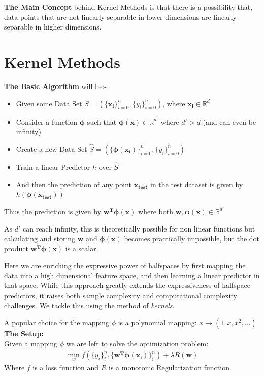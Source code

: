 \documentclass[12pt]{article}
\begin{document}
\noindent
\textbf{The Main Concept} behind Kernel Methods is that there is a possibility that, data-points that are not linearly-separable in lower dimensions are linearly-separable in higher dimensions. 


\section{Kernel Methods}
\noindent\textbf{The Basic Algorithm} will be:-
\vspace{-5pt}
\begin{itemize}
    \setlength\itemsep{2pt}
    \item Given some Data Set $S = (\{\bm{x_i}\}_{i=0}^n, \{y_i\}_{i=0}^n)$, where $\bm{x_i}\in \mathbb{R}^d$
    \item Consider a function $\bm{\phi}$ such that $\bm{\phi(x)} \in \mathbb{R}^{d'}$ where $d' > d$ (and can even be infinity)
    \item Create a new Data Set $\hat{S} = (\{\bm{\phi(x_i)}\}_{i=0}^n, \{y_i\}_{i=0}^n)$
    \item Train a linear Predictor $h$ over $\hat{S}$
    \item And then the prediction of any point $\bm{x_{test}}$ in the test dataset is given by $h(\bm{\phi(x_{test})})$
\end{itemize}
\noindent
Thus the prediction is given by $\bm{w^T\phi(x)}$ where both $\bm{w}, \bm{\phi(x)} \in \mathbb{R}^{d'}$ 

As $d'$ can reach infinity, this is theoretically possible for non linear functions but calculating and storing $\bm{w}$ and $\bm{\phi(x)}$ becomes practically impossible, but the dot product $\bm{w^T\phi(x)}$ is a scalar.

Here we are enriching the expressive power of halfspaces by first mapping the data into a high dimensional feature space, and then learning a linear predictor in that space. While this approach greatly extends the expressiveness of halfspace predictors, it raises both sample complexity and computational complexity challenges. We tackle this using the method of \textit{kernels}.

A popular choice for the mapping $\phi$ is a polynomial mapping: $x \rightarrow (1,x, x^2,\hdots)$ \\

\noindent
\textbf{The Setup:} \\Given a mapping $\phi$ we are left to solve the optimization problem:
\begin{align*}
    \min_w f(\{y_i\}_i^n , \{\bm{w^T\phi(x_i)}\}_i^n) + \lambda R(\bm{w})
\end{align*}
Where $f$ is a loss function and $R$ is a monotonic Regularization function.
\end{document}
